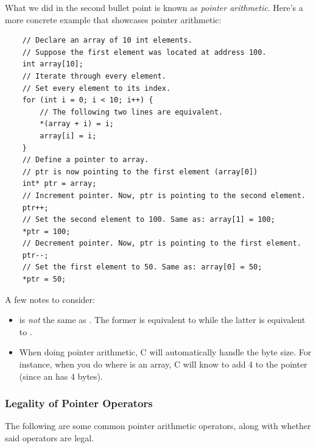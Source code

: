 \documentclass[letterpaper]{article}
\begin{document}
What we did in the second bullet point is known as \emph{pointer arithmetic}. Here's a more concrete example that showcases pointer arithmetic:
\begin{verbatim}
    // Declare an array of 10 int elements.
    // Suppose the first element was located at address 100.
    int array[10];
    // Iterate through every element. 
    // Set every element to its index.
    for (int i = 0; i < 10; i++) {
        // The following two lines are equivalent. 
        *(array + i) = i;
        array[i] = i;
    }
    // Define a pointer to array.
    // ptr is now pointing to the first element (array[0])
    int* ptr = array; 
    // Increment pointer. Now, ptr is pointing to the second element.
    ptr++;
    // Set the second element to 100. Same as: array[1] = 100;
    *ptr = 100; 
    // Decrement pointer. Now, ptr is pointing to the first element.
    ptr--; 
    // Set the first element to 50. Same as: array[0] = 50;
    *ptr = 50; 
\end{verbatim}
A few notes to consider:
\begin{itemize}
    \item {} is \emph{not} the same as . The former is equivalent to  while the latter is equivalent to . 
    \item When doing pointer arithmetic, C will automatically handle the byte size. For instance, when you do  where  is an  array, C will know to add 4 to the pointer (since an  has 4 bytes).  
\end{itemize}

\subsubsection{Legality of Pointer Operators}
The following are some common pointer arithmetic operators, along with whether said operators are legal. 
\end{document}
